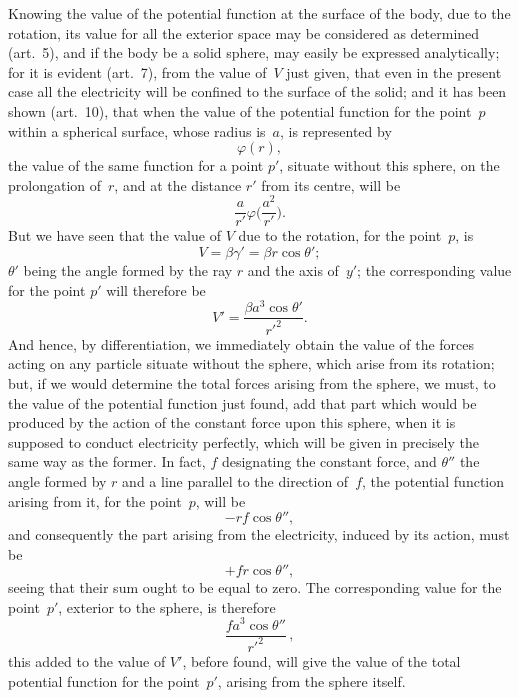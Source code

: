 \documentclass[12pt,notitlepage]{amsart}
\renewcommand{\phi}{\varphi}
\begin{document}
Knowing the value of the potential function at the surface of the body,
due to the rotation, its value for all the exterior space may be considered as
determined (art.~5), and if the body be a solid sphere, may easily be expressed
analytically; for it is evident (art.~7), from the value of~$V$ just given, that
even in the present case all the electricity will be confined to the surface of
the solid; and it has been shown (art.~10), that when the value of the 
potential function for the point~$p$
within a spherical surface, whose radius is~$a$,
is represented by
\[
\phi(r),
\]
the value of the same function for a point $p'$, situate without this sphere, on
the prolongation of~$r$, and at the distance $r'$ from its centre, will be
\[
\frac{a}{r'}\phi\biggl(\frac{a^2}{r'}\biggr).
\]
But we have seen that the value of $V$ due to the rotation,
for the point~$p$, is
\[
V=\beta\gamma'=\beta r\cos\theta';
\]
$\theta'$ being the angle formed by the ray $r$ and the axis of~$y'$;
the corresponding
value for the point $p'$ will therefore be
\[
V'=\frac{\beta a^3\cos\theta'}{r'^2}.
\]
And hence, by differentiation, we immediately obtain the value of the forces
acting on any particle situate without the sphere,
which arise from its rotation;
but, if we would determine the total forces arising from the sphere, we must,
to the value of the potential function just found, add that part which would
be produced by the action of the constant force upon this sphere, when it is
supposed to conduct electricity perfectly, which will be given in precisely the
same way as the former. In fact, $f$ designating the constant force,
and $\theta''$
the angle formed by $r$ and a line parallel to the direction of~$f$,
the potential
function arising from it, for the point~$p$, will be
\[
-rf\cos\theta'',
\]
and consequently the part arising from the electricity, induced by its action,
must be
\[
+fr\cos\theta'',
\]
seeing that their sum ought to be equal to zero. The corresponding value
for the point~$p'$, exterior to the sphere, is therefore
\[
\frac{fa^3\cos\theta''}{r'^2}\,,
\]
this added to the value of $V'$, before found, will give the value of the total
potential function for the point~$p'$, arising from the sphere itself.
\end{document}

